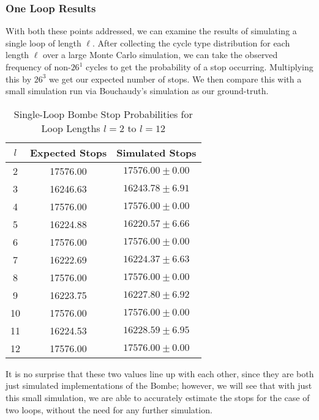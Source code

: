 \subsubsection{One Loop Results}
With both these points addressed, we can examine the results of
simulating a single loop of length $\ell$. After collecting the cycle
type distribution for each length $\ell$ over a large Monte Carlo
simulation, we can take the observed frequency of non-$26^1$ cycles to get the probability of a stop occurring. Multiplying this
by $26^3$ we get our expected number of stops. We then compare this
with a small simulation run via Bouchaudy's simulation as our ground-truth.
\begin{table}[H]
  \centering

  \begin{tabular}{|c|c|c|}
    \hline
    {\bf{ $l$ }} & {\bf{ Expected Stops }} & {\bf{ Simulated Stops }}\\
    \hline
    2 & 17576.00 & $17576.00 \pm 0.00$\\
    \hline
    3 & 16246.63 & $16243.78 \pm 6.91$\\
    \hline
    4 & 17576.00 & $17576.00 \pm 0.00$\\
    \hline
    5 & 16224.88 & $16220.57 \pm 6.66$\\
    \hline
    6 & 17576.00 & $17576.00 \pm 0.00$\\
    \hline
    7 & 16222.69 & $16224.37 \pm 6.63$\\
    \hline
    8 & 17576.00 & $17576.00 \pm 0.00$\\
    \hline
    9 & 16223.75 & $16227.80 \pm 6.92$\\
    \hline
    10 & 17576.00 & $17576.00 \pm 0.00$\\
    \hline
    11 & 16224.53 & $16228.59 \pm 6.95$\\
    \hline
    12 & 17576.00 & $17576.00 \pm 0.00$\\
    \hline
  \end{tabular}
  \caption{Single-Loop Bombe Stop Probabilities for Loop Lengths
  $l=2$ to $l=12$}
\end{table}
\noindent It is no surprise that these two values line up with each
other, since they are both just simulated implementations of the
Bombe; however, we will see that with just this small simulation, we are
able to accurately estimate the stops for the case of two loops,
without the need for any further simulation.
